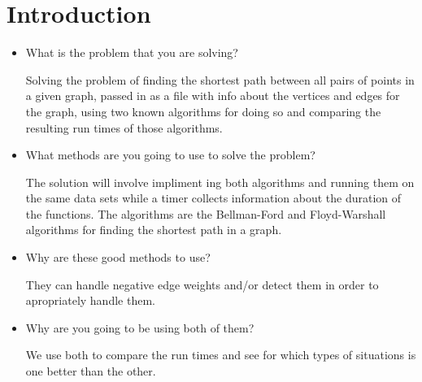 \documentclass[twocolumn]{article}
\begin{document}
\section{Introduction}
\begin{itemize}
    \item What is the problem that you are solving?
    
    Solving the problem of finding the shortest path between all pairs of points in a given graph, passed in as a file with info about the vertices and edges for the graph, using two known algorithms for doing so and comparing the resulting run times of those algorithms.
    
    \item What methods are you going to use to solve the problem?
    
    The solution will involve impliment ing both algorithms and running them on the same data sets while a timer collects information about the duration of the functions. The algorithms are the Bellman-Ford and Floyd-Warshall algorithms for finding the shortest path in a graph.
    
    \item Why are these good methods to use?
    
    They can handle negative edge weights and/or detect them in order to apropriately handle them.
    
    \item Why are you going to be using both of them?
    
    We use both to compare the run times and see for which types of situations is one better than the other.
    
\end{itemize}
\end{document}
